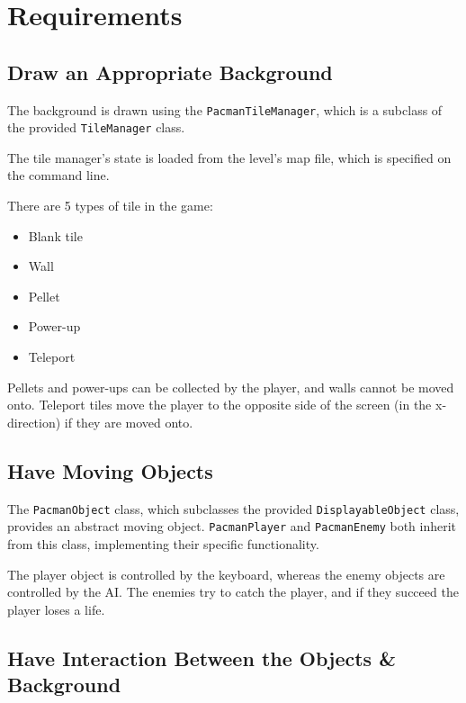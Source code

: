 \documentclass[a4paper,11pt]{article}
\begin{document}
    \section{Requirements}

    \subsection{Draw an Appropriate Background}

    The background is drawn using the \verb!PacmanTileManager!, which is
    a subclass of the provided \verb!TileManager! class.

    The tile manager's state is loaded from the level's map file, which is
    specified on the command line.

    There are 5 types of tile in the game:

    \begin{itemize}
        \item Blank tile
        \item Wall
        \item Pellet
        \item Power-up
        \item Teleport
    \end{itemize}

    Pellets and power-ups can be collected by the player, and walls cannot be
    moved onto. Teleport tiles move the player to the opposite side of the
    screen (in the x-direction) if they are moved onto.

    \subsection{Have Moving Objects}

    The \verb!PacmanObject! class, which subclasses the provided
    \verb!DisplayableObject! class, provides an abstract moving object.
    \verb!PacmanPlayer! and \verb!PacmanEnemy! both inherit from this class,
    implementing their specific functionality.

    The player object is controlled by the keyboard, whereas the enemy objects
    are controlled by the AI. The enemies try to catch the player, and if they
    succeed the player loses a life.

    \subsection{Have Interaction Between the Objects \& Background}
\end{document}
